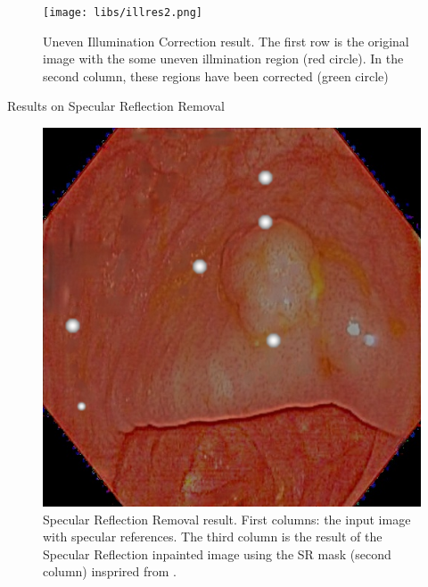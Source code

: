 \documentclass{libs/ufc_format}
\begin{document}
\begin{frame}

        \begin{figure}
            \centering
            \texttt{[image: libs/illres2.png]}
            \caption{Uneven Illumination Correction result. The first row is the original image with the some uneven illmination region (red circle). In the second column, these regions have been corrected (green circle)}
            \label{uneven_illumination_correction2}
        \end{figure}
\end{frame}

\begin{frame}{Results on Specular Reflection Removal}

\begin{figure}
    \centering
    \includegraphics[width=1\textwidth]{libs/srres.png}
    \caption{Specular Reflection Removal result. First columns: the input image with specular references. The third column is the result of the Specular Reflection inpainted image using the SR mask (second column) insprired from \cite{yi2020contextual}.} 
\end{figure}
\end{frame}
\end{document}
